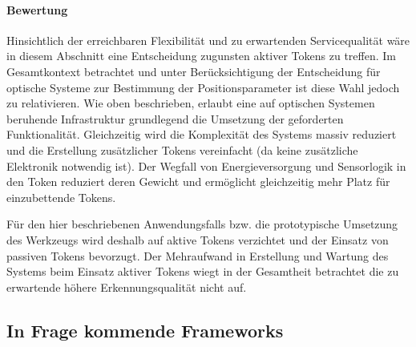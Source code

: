 \paragraph{Bewertung} %
\label{par:zustand_bewertung}

Hinsichtlich der erreichbaren Flexibilität und zu erwartenden Servicequalität wäre in diesem Abschnitt eine Entscheidung zugunsten aktiver Tokens zu treffen. Im Gesamtkontext betrachtet und unter Berücksichtigung der Entscheidung für optische Systeme zur Bestimmung der Positionsparameter ist diese Wahl jedoch zu relativieren. Wie oben beschrieben, erlaubt eine auf optischen Systemen beruhende Infrastruktur grundlegend die Umsetzung der geforderten Funktionalität. Gleichzeitig wird die Komplexität des Systems massiv reduziert und die Erstellung zusätzlicher Tokens vereinfacht (da keine zusätzliche Elektronik notwendig ist). Der Wegfall von Energieversorgung und Sensorlogik in den Token reduziert deren Gewicht und ermöglicht gleichzeitig mehr Platz für einzubettende Tokens.

Für den hier beschriebenen Anwendungsfalls bzw. die prototypische Umsetzung des Werkzeugs wird deshalb auf aktive Tokens verzichtet und der Einsatz von passiven Tokens bevorzugt. Der Mehraufwand in Erstellung und Wartung des Systems beim Einsatz aktiver Tokens wiegt in der Gesamtheit betrachtet die zu erwartende höhere Erkennungsqualität nicht auf.

\subsection{In Frage kommende Frameworks} %
\label{sub:verfügbare_frameworks}

